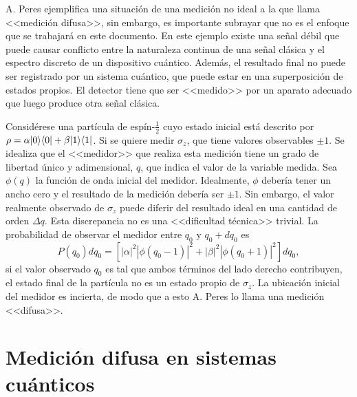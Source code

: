 A. Peres {\cite{peres1997quantum}} ejemplifica una situación de una medición no ideal a la que llama <<medición difusa>>, sin embargo, es importante subrayar que no es el enfoque que se trabajará en este documento. En este ejemplo existe una señal débil que puede causar conflicto entre la naturaleza continua de una señal clásica y el espectro discreto de un dispositivo cuántico. Además, el resultado final no puede ser registrado por un sistema cuántico, que puede estar en una superposición de estados propios. El detector tiene que ser <<medido>> por un aparato adecuado que luego produce otra señal clásica.

Considérese una partícula de espín-$\frac{1}{2}$ cuyo estado inicial está descrito por $\rho=\alpha |0\rangle \langle0| + \beta|1\rangle \langle1|$. Si se quiere medir $\sigma_z$, que tiene valores observables $\pm 1$. Se idealiza que el <<medidor>> que realiza esta medición tiene un grado de libertad único y adimensional, $q$, que indica el valor de la variable medida. Sea $\phi(q)$ la función de onda inicial del medidor. %
Idealmente, $\phi$ debería tener un ancho cero y el resultado de la medición debería ser $\pm 1$. Sin embargo, el valor realmente observado de $\sigma_z$ puede diferir del resultado ideal en una cantidad de orden $\Delta q$. Esta discrepancia no es una <<dificultad técnica>> trivial. La probabilidad de observar el medidor entre $q_0$ y $q_0 + d q_0$ es\[P(q_0)dq_0=[|\alpha|^2|\phi(q_0-1)|^2+|\beta|^2|\phi(q_0+1)|^2]dq_0,\]si el valor observado $q_0$ es tal que ambos términos del lado derecho contribuyen, el estado final de la partícula no es un estado propio de $\sigma_z$. La ubicación inicial del medidor es incierta, de modo que  a esto A. Peres lo llama una medición <<difusa>>.   


\section{Medición difusa en sistemas cuánticos}

